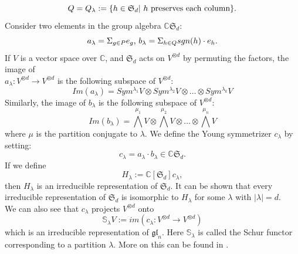 $$Q=Q_\lambda:=\{h\in \mathfrak{S}_d |  \textnormal{ $h$ preserves each column}\}.$$ Consider two elements in the group algebra $\mathbb{C}\mathfrak{S}_d$:
$$a_{\lambda}=\Sigma_{g \in P} e_g \textnormal{, } b_{\lambda}=\Sigma_{h\in Q}sgn(h) \cdot e_h.$$
If $V$ is a vector space over $\mathbb{C}$, and $\mathfrak{S}_d$ acts on $V^{\otimes d}$ by permuting the factors, the image of 
\\$a_\lambda : V^{\otimes d} \rightarrow V^{\otimes d}$ is the following subspace of $V^{\otimes d}$: $$Im(a_\lambda)=Sym^{\lambda_1}V\otimes Sym^{\lambda_2}V\otimes \dots \otimes Sym^{\lambda_k}V$$Similarly, the image of $b_\lambda$ is the following subspace of $V^{\otimes d}$: $$Im(b_\lambda)={\bigwedge}^{\mu_1}V\otimes {\bigwedge}^{\mu_2}V\otimes\dots \otimes  {\bigwedge}^{\mu_n}V$$where $\mu$ is the partition conjugate to $\lambda$. We define the Young symmetrizer $c_{\lambda}$ by setting: $$c_\lambda=a_\lambda \cdot b_\lambda \in \mathbb{C}\mathfrak{S}_d.$$
If we define $$H_{\lambda}:=\mathbb{C}[\mathfrak{S}_{d}]c_{\lambda},$$then $H_{\lambda}$ is an irreducible representation of $\mathfrak{S}_{d}.$ It can be shown that every irreducible representation of $\mathfrak{S}_{d}$ is isomorphic to $H_{\lambda}$ for some $\lambda$ with $|\lambda|=d.$
\\We can also see that $c_\lambda$ projects $V^{\otimes d}$ onto $$\mathbb{S}_\lambda V:=im(c_\lambda:V^{\otimes d} \rightarrow V^{\otimes d})$$ which is  an irreducible representation of $\mathfrak{gl}_{n}$. Here $\mathbb{S}_\lambda$ is called the Schur functor corresponding to a partition $\lambda$. More on this can be found in \cite{fulton}. 


